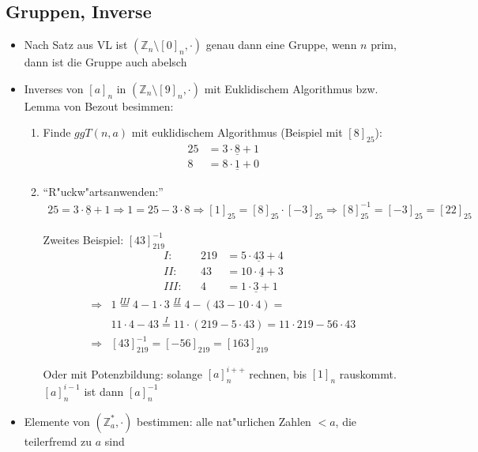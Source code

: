 \documentclass[fleqn,12pt]{scrartcl}
\begin{document}
		\subsection{Gruppen, Inverse}
		\begin{itemize}
			\item
				Nach Satz aus VL ist  $(\mathbb{Z}_n \setminus [0]_n, \cdot)$ genau dann eine Gruppe, wenn $n$ prim, dann ist die Gruppe auch abelsch

			\item
				Inverses von $[a]_n$ in $(\mathbb{Z}_n \setminus [9]_n, \cdot)$ mit Euklidischem Algorithmus bzw. Lemma von Bezout besimmen:
				\begin{enumerate}
					\item
						Finde $ggT(n, a)$ mit euklidischem Algorithmus (Beispiel mit $[8]_{25}$):
						\begin{align*}
							25 &= 3 \cdot \underline{8} + 1\\
							8 &= 8 \cdot \underline{1} + 0
						\end{align*}
					\item
						\enquote{R"uckw"artsanwenden:}
						\begin{align*}
							25 = 3 \cdot \underline{8} + 1 \Rightarrow 1 = 25 - 3 \cdot 8 \Rightarrow [1]_{25} = [8]_{25} \cdot [-3]_{25} \Rightarrow [8]_{25}^{-1} = [-3]_{25} = [22]_{25}
						\end{align*}

						Zweites Beispiel: $[43]_{219}^{-1}$
						\begin{align*}
							I:& &219 &= 5 \cdot \underline{43} + 4 \\
							II:& &43 &= 10 \cdot \underline{4} + 3\\
							III:& &4 &= 1 \cdot \underline{3} + 1
						\end{align*}
						\begin{align*}
							\Rightarrow &1 \overset{III}= 4 - 1\cdot 3 \overset{II}=4-(43-10 \cdot 4) =
							\\  &11\cdot 4 - 43 \overset{I}= 11 \cdot (219 - 5 \cdot 43) = 11 \cdot 219 - 56 \cdot 43\\
							\Rightarrow& [43]_{219}^{-1} = [-56]_{219} = [163]_{219}
						\end{align*}

						Oder mit Potenzbildung: solange $[a]_n^{i++}$ rechnen, bis $[1]_n$ rauskommt. $[a]_n^{i-1}$ ist dann $[a]_n^{-1}$
				\end{enumerate}

			\item
				Elemente von $(\mathbb{Z}_{a}^*, \cdot)$ bestimmen: alle nat"urlichen Zahlen $< a$, die teilerfremd zu $a$ sind


\end{itemize}
\end{document}
